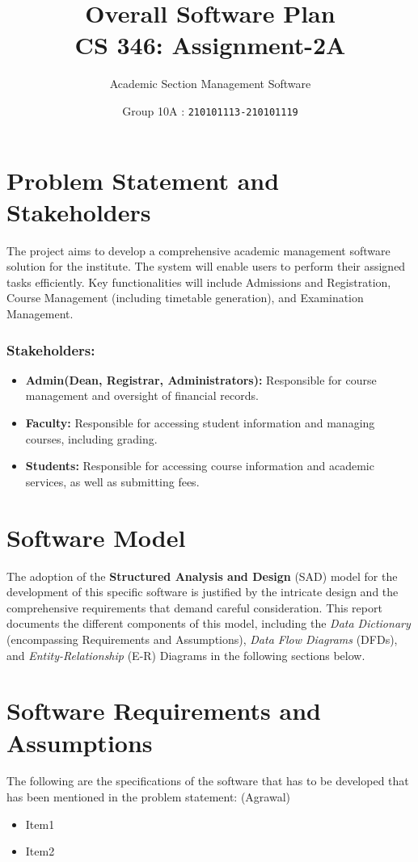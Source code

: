\documentclass[12pt,a4paper]{article}
\begin{document}
\title{\huge \textbf{Overall Software Plan} \\ \LARGE {\textbf{CS 346: Assignment-2A}}}
\author{\Large Academic Section Management Software}
\date{Group 10A : \texttt{210101113-210101119}}
\maketitle


\section{Problem Statement and Stakeholders}
The project aims to develop a comprehensive academic management software solution for the institute. The system will enable users to perform their assigned tasks efficiently. Key functionalities will include Admissions and Registration, Course Management (including timetable generation), and Examination Management.

\subsubsection*{Stakeholders:}
\begin{itemize}
    \item \textbf{Admin(Dean, Registrar, Administrators):} Responsible for course management and oversight of financial records.
    \item \textbf{Faculty:} Responsible for accessing student information and managing courses, including grading.
    \item \textbf{Students:} Responsible for accessing course information and academic services, as well as submitting fees.
\end{itemize}

\section{Software Model}
The adoption of the \textbf{Structured Analysis and Design} (SAD) model for the development of this specific software is justified by the intricate design and the comprehensive requirements that demand careful consideration. This report documents the different components of this model, including the \textit{Data Dictionary} (encompassing Requirements and Assumptions), \textit{Data Flow Diagrams} (DFDs), and \textit{Entity-Relationship} (E-R) Diagrams in the following sections below.
    

\section{Software Requirements and Assumptions}
The following are the specifications of the software that has to be developed that has been mentioned in the problem statement: (Agrawal)
\begin{itemize}
    \item Item1
    \item Item2
\end{itemize}
\end{document}
